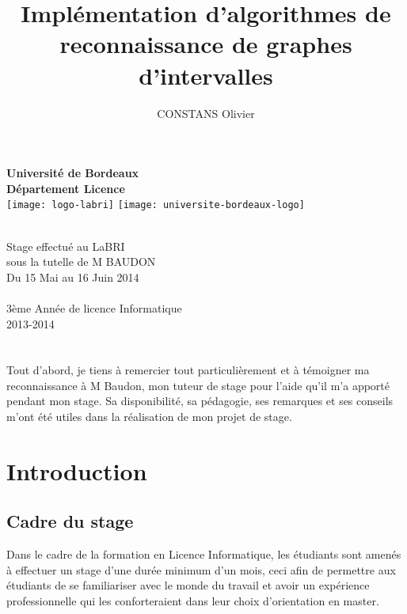 \documentclass[12pt, a4paper]{report}
\title{Implémentation d'algorithmes de  reconnaissance de graphes d'intervalles}
\author{
	CONSTANS Olivier
	}
\begin{document}
\makeatletter
  \begin{titlepage}
  \centering
      {\large\textbf{	Université de Bordeaux\\
       Département Licence}}\\
      \texttt{[image: logo-labri]}
      \hfill
      \texttt{[image: universite-bordeaux-logo]}\\
    \vspace{4cm}
      
       {\LARGE \textbf{\@title}} \\
    \vspace{2cm}
     {\large Stage effectué au LaBRI}\\
      {\large sous la tutelle de M BAUDON}\\
      {\large Du 15 Mai au 16 Juin 2014}\\
    \vspace{4em}
        {\large \@author} \\
    \vfill
    	{\large 3ème Année de licence Informatique}\\
    	{\large \textsc{2013-2014}}\\
    
    \end{titlepage}


\tableofcontents

\chapter*{}


Tout d'abord, je tiens à remercier tout particulièrement et à témoigner ma reconnaissance à M Baudon, mon tuteur de stage pour l'aide qu'il m'a apporté pendant mon stage. Sa disponibilité, sa pédagogie, ses remarques et ses conseils m'ont été utiles dans la réalisation de mon projet de stage.

\chapter{Introduction}
\section{Cadre du stage}
Dans le cadre de la formation en Licence Informatique, les étudiants sont amenés à effectuer un stage d'une durée minimum d'un mois, ceci afin de permettre aux étudiants de se familiariser avec le monde du travail et avoir un expérience professionnelle qui les conforteraient dans leur choix d'orientation en master.
\end{document}
